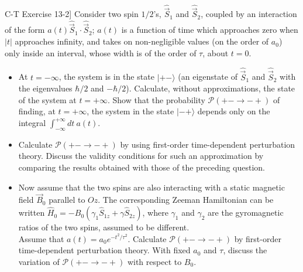 \documentclass[10pt,a4paper]{article}
\newenvironment{problem}[2][Problem]{\begin{trivlist}
\item[\hskip \labelsep {\bfseries #1}\hskip \labelsep {\bfseries #2.}]}{\end{trivlist}}
\begin{document}
\begin{problem}{2}

[C-T Exercise 13-2] Consider two spin $1/2$'s, $\hat{\vec{S}}_1$ and $\hat{\vec{S}}_2$, coupled by an interaction of the form $a(t)\hat{\vec{S}}_1\cdot\hat{\vec{S}}_2$; $a(t)$ is a function of time which approaches zero when $|t|$ approaches infinity, and takes on non-negligible values (on the order of $a_0$) only inside an interval, whose width is of the order of $\tau$, about $t=0$.
\begin{itemize}
\item[(a)] At $t=-\infty$, the system is in the state $|+-\rangle$ (an eigenstate of $\hat{\vec{S}}_1$ and $\hat{\vec{S}}_2$ with the eigenvalues $\hbar/2$ and $-\hbar/2$). Calculate, without approximations, the state of the system at $t=+\infty$. Show that the probability $\mathscr{P}(+-\rightarrow-+)$ of finding, at $t=+\infty$, the system in the state $|-+\rangle$ depends only on the integral $\int_{-\infty}^{+\infty}dt~a(t)$.
\item[(b)] Calculate $\mathscr{P}(+-\rightarrow-+)$ by using first-order time-dependent perturbation theory. Discuss the validity conditions for such an approximation by comparing the results obtained with those of the preceding question.
\item[(c)] Now assume that the two spins are also interacting with a static magnetic field $\vec{B}_0$ parallel to $Oz$. The corresponding Zeeman Hamiltonian can be written $\hat{H}_0=-B_0(\gamma_1\hat{S}_{1z}+\gamma\hat{S}_{2z})$, where $\gamma_1$ and $\gamma_2$ are the gyromagnetic ratios of the two spins, assumed to be different.\\
Assume that $a(t)=a_0e^{-t^2/\tau^2}$. Calculate $\mathscr{P}(+-\rightarrow-+)$ by first-order time-dependent perturbation theory. With fixed $a_0$ and $\tau$, discuss the variation of $\mathscr{P}(+-\rightarrow-+)$ with respect to $B_0$.
\end{itemize}
\end{problem}
\end{document}

